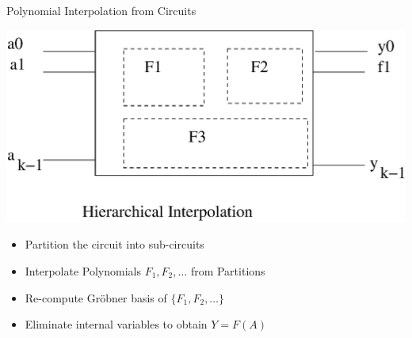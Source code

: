 \documentclass[xcolor=dvipsnames]{beamer}
\begin{document}
\begin{frame}{\large Polynomial Interpolation from Circuits}

\centerline{
\includegraphics[scale=0.5]{h.eps}
}


\begin{itemize}
\item Partition the circuit into sub-circuits
\item Interpolate Polynomials $F_1, F_2, \dots$ from Partitions
\item Re-compute Gr\"obner basis of $\{ F_1, F_2, \dots \}$
\item Eliminate internal variables to obtain $Y = F(A)$   
\end{itemize}




\end{frame}


\end{document}
